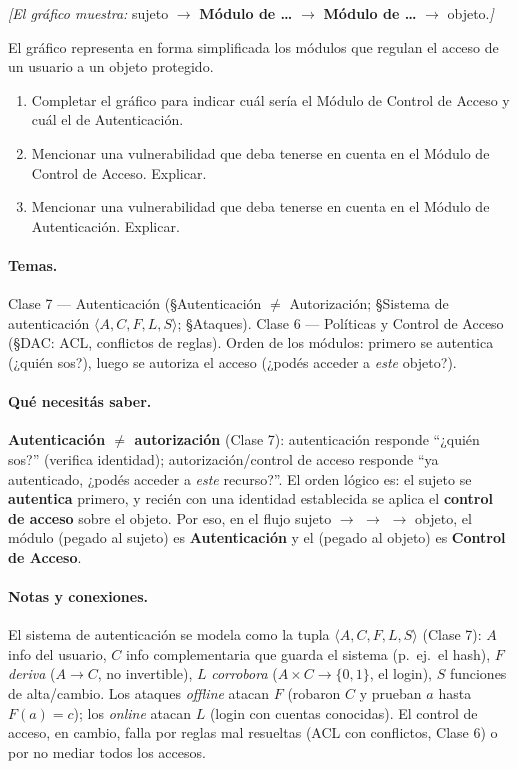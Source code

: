 \begin{consigna}
\textit{[El gráfico muestra: }sujeto $\to$ \textbf{Módulo de \ldots} $\to$ \textbf{Módulo de
\ldots} $\to$ objeto.\textit{]}

El gráfico representa en forma simplificada los módulos que regulan el acceso de un usuario a un
objeto protegido.
\begin{enumerate}[label=\alph*)]
  \item Completar el gráfico para indicar cuál sería el Módulo de Control de Acceso y cuál el de
        Autenticación.
  \item Mencionar una vulnerabilidad que deba tenerse en cuenta en el Módulo de Control de Acceso.
        Explicar.
  \item Mencionar una vulnerabilidad que deba tenerse en cuenta en el Módulo de Autenticación.
        Explicar.
\end{enumerate}
\end{consigna}

\paragraph{Temas.}
Clase 7 — Autenticación (\S Autenticación $\neq$ Autorización; \S Sistema de autenticación
$\langle A,C,F,L,S\rangle$; \S Ataques). Clase 6 — Políticas y Control de Acceso (\S DAC: ACL,
conflictos de reglas). Orden de los módulos: primero se autentica (¿quién sos?), luego se
autoriza el acceso (¿podés acceder a \emph{este} objeto?).

\paragraph{Qué necesitás saber.}
\textbf{Autenticación $\neq$ autorización} (Clase 7): autenticación responde ``¿quién sos?''
(verifica identidad); autorización/control de acceso responde ``ya autenticado, ¿podés acceder a
\emph{este} recurso?''. El orden lógico es: el sujeto se \textbf{autentica} primero, y recién con
una identidad establecida se aplica el \textbf{control de acceso} sobre el objeto. Por eso, en el
flujo sujeto $\to$  $\to$  $\to$ objeto, el módulo  (pegado al sujeto) es
\textbf{Autenticación} y el  (pegado al objeto) es \textbf{Control de Acceso}.

\paragraph{Notas y conexiones.}
El sistema de autenticación se modela como la tupla $\langle A,C,F,L,S\rangle$ (Clase 7): $A$ info
del usuario, $C$ info complementaria que guarda el sistema (p.\ ej.\ el hash), $F$ \emph{deriva}
($A\to C$, no invertible), $L$ \emph{corrobora} ($A\times C\to\{0,1\}$, el login), $S$ funciones
de alta/cambio. Los ataques \emph{offline} atacan $F$ (robaron $C$ y prueban $a$ hasta $F(a)=c$);
los \emph{online} atacan $L$ (login con cuentas conocidas). El control de acceso, en cambio, falla
por reglas mal resueltas (ACL con conflictos, Clase 6) o por no mediar todos los accesos.

